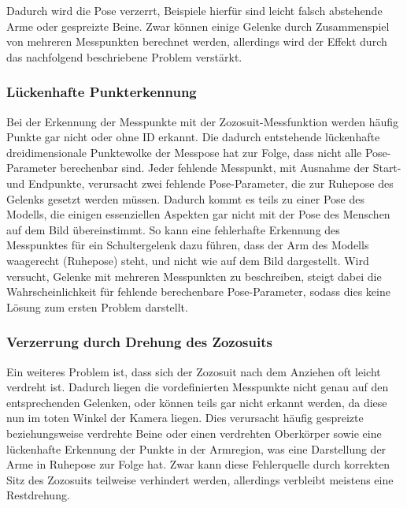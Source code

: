 Dadurch wird die Pose verzerrt, Beispiele hierfür sind leicht falsch abstehende Arme oder gespreizte Beine. Zwar können 
einige Gelenke durch Zusammenspiel von mehreren Messpunkten berechnet werden, allerdings 
wird der Effekt durch das nachfolgend beschriebene Problem verstärkt.

\subsubsection*{Lückenhafte Punkterkennung}
Bei der Erkennung der Messpunkte mit der Zozosuit-Messfunktion werden häufig Punkte gar nicht oder ohne
ID erkannt. Die dadurch entstehende lückenhafte dreidimensionale Punktewolke der Messpose hat zur Folge, dass
nicht alle Pose-Parameter berechenbar sind. Jeder fehlende Messpunkt, mit Ausnahme der Start- und Endpunkte, 
verursacht zwei fehlende Pose-Parameter, die zur Ruhepose des Gelenks gesetzt werden müssen. Dadurch kommt es teils
zu einer Pose des Modells, die einigen essenziellen Aspekten gar nicht mit der Pose des Menschen auf dem Bild übereinstimmt.
So kann eine fehlerhafte Erkennung des Messpunktes für ein Schultergelenk dazu führen, dass der Arm des Modells 
waagerecht (Ruhepose) steht, und nicht wie auf dem Bild dargestellt.
Wird versucht, Gelenke mit mehreren Messpunkten zu beschreiben, steigt dabei 
die Wahrscheinlichkeit für fehlende berechenbare Pose-Parameter, sodass dies keine Lösung zum ersten Problem darstellt.


\subsubsection*{Verzerrung durch Drehung des Zozosuits}
Ein weiteres Problem ist, dass sich der Zozosuit nach dem Anziehen oft leicht verdreht ist. Dadurch liegen die
vordefinierten Messpunkte nicht genau auf den entsprechenden Gelenken, oder können teils gar nicht erkannt werden,
da diese nun im toten Winkel der Kamera liegen. Dies verursacht häufig gespreizte beziehungsweise verdrehte Beine oder einen 
verdrehten Oberkörper sowie eine lückenhafte Erkennung der Punkte in der Armregion, was eine Darstellung der Arme
in Ruhepose zur Folge hat. Zwar kann diese Fehlerquelle durch korrekten Sitz des Zozosuits teilweise verhindert werden,
allerdings verbleibt meistens eine Restdrehung.


